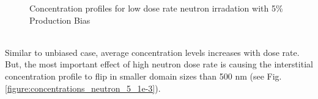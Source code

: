 \documentclass[a4paper]{article}
\begin{document}
\begin{figure}[h!]
      \caption{Concentration profiles for low dose rate neutron irradation with 5\% Production Bias}
      \label{figure:concentrations_neutron_5_1e-6}
    \end{figure}\\

    Similar to unbiased case, average concentration levels increases with dose rate. But, the most important effect of high neutron dose rate is causing the interstitial concentration profile to flip in smaller domain sizes than 500 nm (see Fig. \ref{figure:concentrations_neutron_5_1e-3}).\\
    \begin{figure}[htb!]  %
      \centering
      \qquad

\end{figure}
\end{document}
